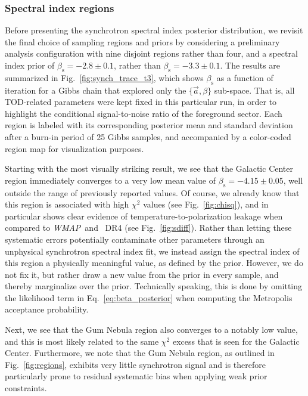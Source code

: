 \documentclass[twocolumn]{aa}
\def\WMAP{\textit{WMAP}}
\renewcommand{\a}[0]{\vec{a}}
\newcommand{\?}[1]{\textcolor{red}{{\bf [#1]}}}
\begin{document}
\subsubsection{Spectral index regions}
\label{sec:regions}

Before presenting the synchrotron spectral index posterior
distribution, we revisit the final choice of sampling regions and
priors by considering a preliminary analysis configuration with nine
disjoint regions rather than four, and a spectral index prior of
$\beta_{\mathrm{s}}=-2.8\pm0.1$, rather than
$\beta_{\mathrm{s}}=-3.3\pm0.1$. The results are summarized in
Fig.~\ref{fig:synch_trace_t3}, which shows $\beta_{\mathrm{s}}$ as a
function of iteration for a Gibbs chain that explored only the
$\{\a,\beta\}$ sub-space.  That is, all TOD-related parameters were
kept fixed in this particular run, in order to highlight the
conditional signal-to-noise ratio of the foreground sector. Each
region is labeled with its corresponding posterior mean and standard
deviation after a burn-in period of 25 Gibbs samples, and accompanied
by a color-coded region map for visualization purposes.

Starting with the most visually striking result, we see that the Galactic Center
region immediately converges to a very low mean value of
$\beta_{\mathrm{s}}=-4.15\pm0.05$, well outside the range of previously reported
values. Of course, we already know that this region is associated with high
$\chi^2$ values (see Fig.~\ref{fig:chisq}), and in particular shows clear evidence of
temperature-to-polarization leakage when compared to \WMAP\ and \Planck\ DR4 (see
Fig.~\ref{fig:sdiff}). Rather than letting these systematic errors potentially
contaminate other parameters through an unphysical synchrotron spectral index
fit, we instead assign the spectral index of this region a physically meaningful
value, as defined by the prior. However, we do not fix it, but rather draw a new
value from the prior in every sample, and thereby marginalize over the prior.
Technically speaking, this is done by omitting the likelihood term in
Eq.~\eqref{eq:beta_posterior} when computing the Metropolis acceptance
probability.

Next, we see that the Gum Nebula region also converges to a notably
low value, and this is most likely related to the same $\chi^2$ excess
that is seen for the Galactic Center. Furthermore, we note that the
Gum Nebula region, as outlined in Fig.~\ref{fig:regions}, exhibits
very little synchrotron signal and is therefore particularly prone to
residual systematic bias when applying weak prior constraints.
\end{document}
